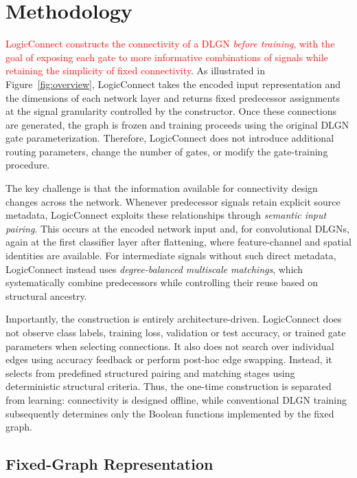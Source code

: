 % 
\section{Methodology}
\label{sec:method}

\textcolor{red}{LogicConnect constructs the connectivity of a DLGN \emph{before training},
with the goal of exposing each gate to more informative combinations of
signals while retaining the simplicity of fixed connectivity}. As illustrated
in Figure~\ref{fig:overview}, LogicConnect takes the encoded input
representation and the dimensions of each network layer and returns fixed
predecessor assignments at the signal granularity controlled by the
constructor. Once these connections are
generated, the graph is frozen and training proceeds using the original DLGN
gate parameterization. Therefore, LogicConnect does not introduce additional
routing parameters, change the number of gates, or modify the gate-training
procedure.

The key challenge is that the information available for connectivity design
changes across the network. Whenever predecessor signals retain explicit
source metadata, LogicConnect exploits these relationships through
\emph{semantic input pairing}. This occurs at the encoded network input and,
for convolutional DLGNs, again at the first classifier layer after
flattening, where feature-channel and spatial identities are available. For
intermediate signals without such direct metadata, LogicConnect instead uses
\emph{degree-balanced multiscale matchings}, which systematically combine
predecessors while controlling their reuse based on structural ancestry.

Importantly, the construction is entirely architecture-driven. LogicConnect
does not observe class labels, training loss, validation or test accuracy, or
trained gate parameters when selecting connections. It also does not search
over individual edges using accuracy feedback or perform post-hoc edge
swapping. Instead, it selects from predefined structured pairing and matching
stages using deterministic structural criteria. Thus, the one-time
construction is separated from learning: connectivity is designed offline,
while conventional DLGN training subsequently determines only the Boolean
functions implemented by the fixed graph. 

\subsection{Fixed-Graph Representation}
\label{sec:representation}

